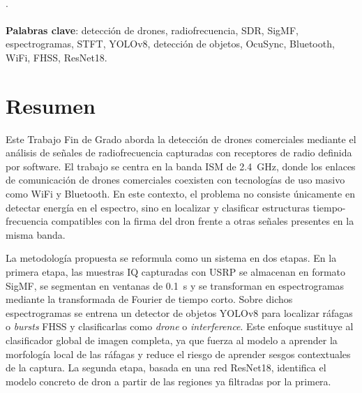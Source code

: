 
\thispagestyle{empty}

\noindent\textbf{\tfgtitulo}\\
\tfgsubtitulo.\\[0.4cm]

\noindent\tfgautor\\[0.6cm]

\noindent\textbf{Palabras clave}: detección de drones, radiofrecuencia, SDR, SigMF, espectrogramas, STFT, YOLOv8, detección de objetos, OcuSync, Bluetooth, WiFi, FHSS, ResNet18.

\vspace{0.6cm}
\section*{Resumen}

Este Trabajo Fin de Grado aborda la detección de drones comerciales mediante el análisis de señales de radiofrecuencia capturadas con receptores de radio definida por software. El trabajo se centra en la banda ISM de \SI{2.4}{\giga\hertz}, donde los enlaces de comunicación de drones comerciales coexisten con tecnologías de uso masivo como WiFi y Bluetooth. En este contexto, el problema no consiste únicamente en detectar energía en el espectro, sino en localizar y clasificar estructuras tiempo-frecuencia compatibles con la firma del dron frente a otras señales presentes en la misma banda.

La metodología propuesta se reformula como un sistema en dos etapas. En la primera etapa, las muestras IQ capturadas con USRP se almacenan en formato SigMF, se segmentan en ventanas de \SI{0.1}{\second} y se transforman en espectrogramas mediante la transformada de Fourier de tiempo corto. Sobre dichos espectrogramas se entrena un detector de objetos YOLOv8 para localizar ráfagas o \emph{bursts} FHSS y clasificarlas como \emph{drone} o \emph{interference}. Este enfoque sustituye al clasificador global de imagen completa, ya que fuerza al modelo a aprender la morfología local de las ráfagas y reduce el riesgo de aprender sesgos contextuales de la captura. La segunda etapa, basada en una red ResNet18, identifica el modelo concreto de dron a partir de las regiones ya filtradas por la primera.

